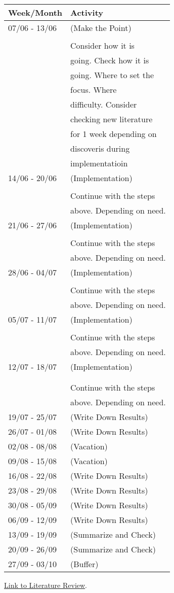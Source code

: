 \documentclass[a4paper]{article}
\begin{document}
\begin{center}
\begin{tabular}{|l|l|}
\hline
Week/Month & Activity \\
\hline
07/06 - 13/06 & (Make the Point) \\
 & \\
 & Consider how it is \\
 & going. Check how it is \\
 & going. Where to set the \\
 & focus. Where \\
 & difficulty. Consider \\
 & checking new literature \\
 & for 1 week depending on \\
 & discoveris during \\
 & implementatioin \\
\hline
14/06 - 20/06 & (Implementation) \\
 & \\
 & Continue with the steps \\
 & above. Depending on need. \\
\hline
21/06 - 27/06 & (Implementation) \\
 & \\
 & Continue with the steps \\
 & above. Depending on need. \\
\hline
28/06 - 04/07 & (Implementation) \\
 & \\
 & Continue with the steps \\
 & above. Depending on need. \\
\hline
05/07 - 11/07 & (Implementation) \\
 & \\
 & Continue with the steps \\
 & above. Depending on need. \\
\hline
12/07 - 18/07 & (Implementation) \\
 & \\
 & \\
 & Continue with the steps \\
 & above. Depending on need. \\
\hline
19/07 - 25/07 & (Write Down Results) \\
\hline
26/07 - 01/08 & (Write Down Results) \\
\hline
02/08 - 08/08 & (Vacation) \\
\hline
09/08 - 15/08 & (Vacation) \\
\hline
16/08 - 22/08 & (Write Down Results) \\
\hline
23/08 - 29/08 & (Write Down Results) \\
\hline
30/08 - 05/09 & (Write Down Results) \\
\hline
06/09 - 12/09 & (Write Down Results) \\
\hline
13/09 - 19/09 & (Summarize and Check) \\
\hline
20/09 - 26/09 & (Summarize and Check) \\
\hline
27/09 - 03/10 & (Buffer) \\
\hline
\end{tabular}
\end{center}

\href{https://marcohassan.github.io/bits-of-experience/posts/bayesian-networks/}{Link to Literature Review}.

\newpage



\end{document}
